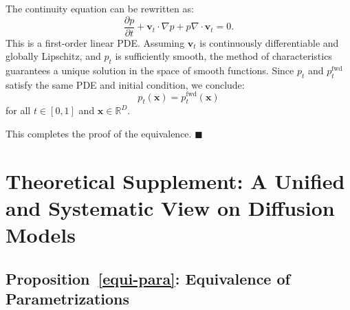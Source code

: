 The continuity equation can be rewritten as:
\[
\frac{\partial p}{\partial t} + \mathbf{v}_t \cdot \nabla p + p \nabla \cdot \mathbf{v}_t = 0.
\]
This is a first-order linear PDE. Assuming $ \mathbf{v}_t $ is continuously differentiable and globally Lipschitz, and $ p_t $ is sufficiently smooth, the method of characteristics guarantees a unique solution in the space of smooth functions. Since $ p_t $ and $ p_t^{\mathrm{fwd}} $ satisfy the same PDE and initial condition, we conclude:
\[
p_t(\mathbf{x}) = p_t^{\mathrm{fwd}}(\mathbf{x})
\]
for all $t\in[0,1]$ and $\mathbf{x} \in \mathbb{R}^D$. 

This completes the proof of the equivalence.
\hfill$\blacksquare$

\clearpage
\newpage

\section{Theoretical Supplement: A Unified and Systematic View on Diffusion Models}\label{app-sec:equiv-para}

\subsection{Proposition~\ref{equi-para}: Equivalence of Parametrizations}

